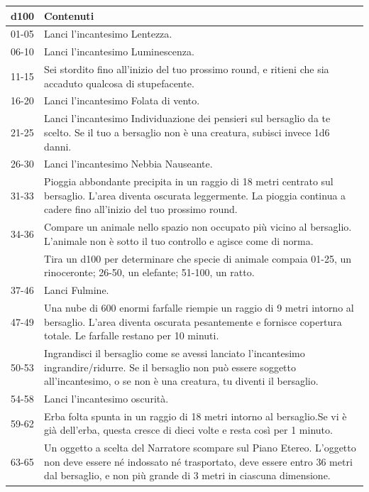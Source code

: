 \begin{multicols}{2}
\noindent\begin{tabularx}{\linewidth}{lX}
	\toprule
\rowcolor{gray!20}\textbf{d100}& \textbf{Contenuti}\\
\toprule
01-05 &Lanci l'incantesimo Lentezza.\\
\rowcolor{gray!20}06-10 &Lanci l'incantesimo Luminescenza.\\
11-15 &Sei stordito fino all'inizio del tuo prossimo round, e ritieni che sia accaduto qualcosa di stupefacente.\\
\rowcolor{gray!20}16-20 &Lanci l'incantesimo Folata di vento.\\
21-25 &Lanci l'incantesimo Individuazione dei pensieri sul bersaglio da te scelto. Se il tuo a bersaglio non è una creatura, subisci invece 1d6 danni.\\
\rowcolor{gray!20}26-30 &Lanci l'incantesimo Nebbia Nauseante.\\
31-33 &Pioggia abbondante precipita in un raggio di 18 metri centrato sul bersaglio. L'area diventa oscurata leggermente. La pioggia continua a cadere fino all'inizio del tuo prossimo round.\\
\rowcolor{gray!20}34-36 &Compare un animale nello spazio non occupato più vicino al bersaglio. L'animale non è sotto il tuo controllo e agisce come di norma. \\
&Tira un d100 per determinare che specie di animale compaia 01-25, un rinoceronte; 26-50, un elefante; 51-100, un ratto.\\
\rowcolor{gray!20}37-46 &Lanci Fulmine.\\
47-49 &Una nube di 600 enormi farfalle riempie un raggio di 9 metri intorno al bersaglio. L'area diventa oscurata pesantemente e fornisce copertura totale. Le farfalle restano per 10 minuti.\\
\rowcolor{gray!20}50-53 &Ingrandisci il bersaglio come se avessi lanciato l'incantesimo ingrandire/ridurre. Se il bersaglio non può essere soggetto all'incantesimo, o se non è una creatura, tu diventi il bersaglio.\\
54-58 &Lanci l'incantesimo oscurità.\\
\rowcolor{gray!20}59-62 &Erba folta spunta in un raggio di 18 metri intorno al bersaglio.Se vi è già dell'erba, questa cresce di dieci volte e resta così per 1 minuto.\\
63-65 &Un oggetto a scelta del Narratore scompare sul Piano Etereo. L'oggetto non deve essere né indossato né trasportato, deve essere entro 36 metri dal bersaglio, e non più grande di 3 metri in ciascuna dimensione.\\

\end{tabularx}
\end{multicols}
